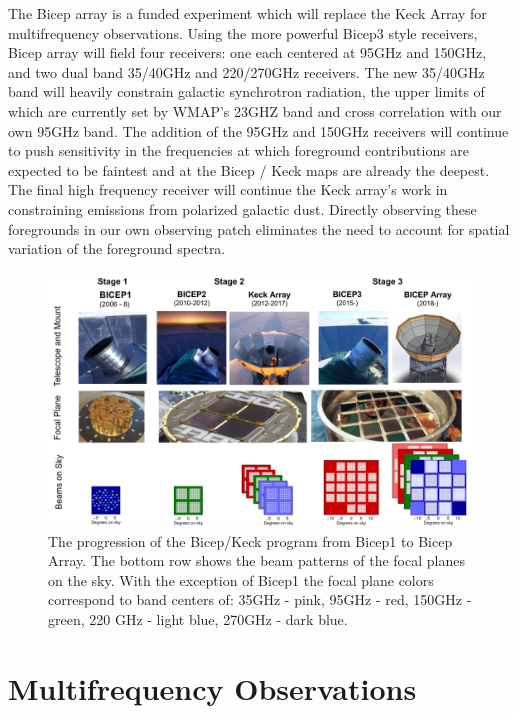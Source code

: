 \documentclass[12pt]{article}
\begin{document}
The Bicep array is a funded experiment which will replace the Keck Array for
multifrequency observations. Using the more powerful Bicep3 style receivers,
Bicep array will field four receivers: one each centered at 95GHz and 150GHz,
and two dual band 35/40GHz and 220/270GHz receivers. The new 35/40GHz band will
heavily constrain galactic synchrotron radiation, the upper limits of
which are currently set by WMAP's 23GHZ band and cross correlation with our
own 95GHz band. The addition of the 95GHz and 150GHz receivers will continue
to push sensitivity in the frequencies at which foreground contributions are
expected to be faintest and at the Bicep / Keck maps are already the deepest.
The final high frequency receiver will continue the Keck array's work in
constraining emissions from polarized galactic dust. Directly observing
these foregrounds in our own observing patch eliminates the need to account
for spatial variation of the foreground spectra.



\begin{figure}
	\center
	\includegraphics[width=.8\textwidth]{BK_progression.png}
	\caption{The progression of the Bicep/Keck program from Bicep1 to Bicep
	Array. The bottom row shows the beam patterns of the focal planes on the
	sky. With the exception of Bicep1 the focal plane colors correspond to
	band centers of: 35GHz - pink, 95GHz - red, 150GHz - green, 220 GHz -
	light blue, 270GHz - dark blue.}
	\label{fig:BK_progression}
\end{figure}




\section{Multifrequency Observations}
\end{document}
